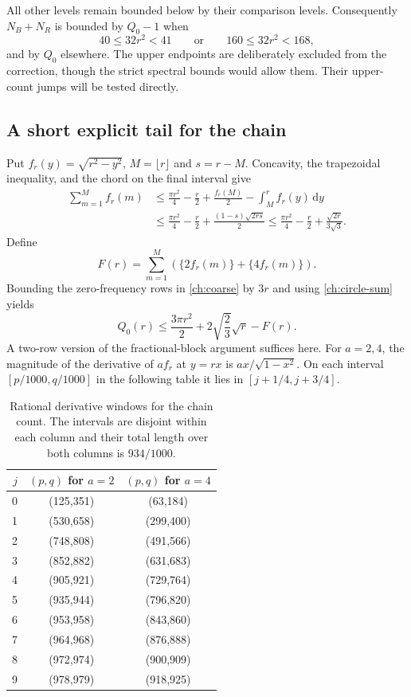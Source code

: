 \documentclass[11pt,reqno]{amsart}
\numberwithin{equation}{section}
\newcommand{\dd}{\,\mathrm d}
\begin{document}
All other levels remain bounded below by their comparison levels.
Consequently $N_B+N_R$ is bounded by $Q_0-1$ when
\begin{equation}\label{ch:corrections}
 40\le32r^2<41\qquad\text{or}\qquad160\le32r^2<168,
\end{equation}
and by $Q_0$ elsewhere. The upper endpoints are deliberately
excluded from the correction, though the strict spectral bounds
would allow them. Their upper-count jumps will be tested directly.

\subsection{A short explicit tail for the chain}

Put $f_r(y)=\sqrt{r^2-y^2}$, $M=\lfloor r\rfloor$ and $s=r-M$.
Concavity, the trapezoidal inequality, and the chord on the final
interval give
\begin{equation}\label{ch:circle-sum}
 \begin{split}
 \sum_{m=1}^M f_r(m)
 &\le\frac{\pi r^2}{4}-\frac r2+
       \frac{f_r(M)}2-\int_M^r f_r(y)\dd y\\
 &\le\frac{\pi r^2}{4}-\frac r2+
       \frac{(1-s)\sqrt{2rs}}2
 \le\frac{\pi r^2}{4}-\frac r2+
       \frac{\sqrt{2r}}{3\sqrt3}.
 \end{split}
\end{equation}
Define
\[
 F(r)=\sum_{m=1}^M\left(\{2f_r(m)\}+\{4f_r(m)\}\right).
\]
Bounding the zero-frequency rows in \eqref{ch:coarse} by $3r$
and using \eqref{ch:circle-sum} yields
\begin{equation}\label{ch:tail-excess}
 Q_0(r)\le\frac{3\pi r^2}{2}+2\sqrt{\frac23}\sqrt r-F(r).
\end{equation}
A two-row version of the fractional-block argument suffices here.
For $a=2,4$, the magnitude of the derivative of $af_r$ at $y=rx$
is $ax/\sqrt{1-x^2}$. On each interval $[p/1000,q/1000]$
in the following table it lies in $[j+1/4,j+3/4]$.
\begin{table}[tb]
\centering
\begin{tabular}{@{}rcc@{}}
\toprule
$j$&$(p,q)$ for $a=2$&$(p,q)$ for $a=4$\\\midrule
0&(125,351)&(63,184)\\
1&(530,658)&(299,400)\\
2&(748,808)&(491,566)\\
3&(852,882)&(631,683)\\
4&(905,921)&(729,764)\\
5&(935,944)&(796,820)\\
6&(953,958)&(843,860)\\
7&(964,968)&(876,888)\\
8&(972,974)&(900,909)\\
9&(978,979)&(918,925)\\\bottomrule
\end{tabular}
\caption{Rational derivative windows for the chain count.
The intervals are disjoint within each column and their total
length over both columns is $934/1000$.}
\label{ch:windows}
\end{table}
\end{document}
